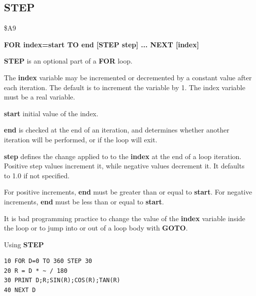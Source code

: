 
\newpage
\subsection{STEP}
\begin{description}[leftmargin=2cm,style=nextline]
\item [Token:] \$A9
\item [Format:] {\bf FOR index=start TO end [STEP step] ... NEXT [index]}
\item [Usage:] {\bf STEP} is an optional part of a
               {\bf FOR} loop.

               The {\bf index} variable may be incremented or decremented
               by a constant value after each iteration. The default
               is to increment the variable by 1.
               The index variable must be a real variable.

               {\bf start} initial value of the index.

               {\bf end} is checked at the end of an iteration,
               and determines whether another iteration will be performed,
               or if the loop will exit.

               {\bf step} defines the change applied to
               to the {\bf index} at the end of a loop iteration.
               Positive step values increment it, while negative values
               decrement it. It defaults to 1.0 if not specified.

\item [Remarks:] For positive increments, {\bf end} must be greater
               than or equal to {\bf start}. For negative increments,
               {\bf end} must be less than or equal to {\bf start}.

               It is bad programming practice to change the value
               of the {\bf index} variable inside the loop or to
               jump into or out of a loop body with {\bf GOTO}.

\item [Example:] Using {\bf STEP}
\begin{tcolorbox}[colback=black,coltext=white]
\verbatimfont{\codefont}
\begin{verbatim}
10 FOR D=0 TO 360 STEP 30
20 R = D * ~ / 180
30 PRINT D;R;SIN(R);COS(R);TAN(R)
40 NEXT D
\end{verbatim}
\end{tcolorbox}
\end{description}

